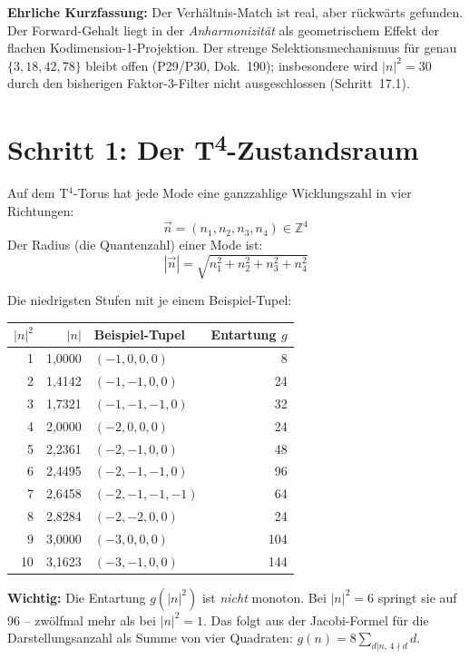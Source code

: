 \textbf{Ehrliche Kurzfassung:} Der Verhältnis-Match ist real, aber
rückwärts gefunden. Der Forward-Gehalt liegt in der \emph{Anharmonizität}
als geometrischem Effekt der flachen Kodimension-1-Projektion. Der
strenge Selektionsmechanismus für genau $\{3,18,42,78\}$ bleibt offen
(P29/P30, Dok.~190); insbesondere wird $|n|^2=30$ durch den bisherigen
Faktor-3-Filter nicht ausgeschlossen (Schritt~17.1).

\section{Schritt 1: Der T\textsuperscript{4}-Zustandsraum}

Auf dem T$^4$-Torus hat jede Mode eine ganzzahlige Wicklungszahl in
vier Richtungen:
\[
  \vec{n} = (n_1, n_2, n_3, n_4) \in \mathbb{Z}^4
\]
Der Radius (die Quantenzahl) einer Mode ist:
\[
  |\vec{n}| = \sqrt{n_1^2 + n_2^2 + n_3^2 + n_4^2}
\]

Die niedrigsten Stufen mit je einem Beispiel-Tupel:

\begin{center}
\begin{tabular}{rrlr}
\toprule
$|n|^2$ & $|n|$ & Beispiel-Tupel & Entartung $g$ \\
\midrule
1 & 1{,}0000 & $(-1,0,0,0)$ & 8 \\
2 & 1{,}4142 & $(-1,-1,0,0)$ & 24 \\
3 & 1{,}7321 & $(-1,-1,-1,0)$ & 32 \\
4 & 2{,}0000 & $(-2,0,0,0)$ & 24 \\
5 & 2{,}2361 & $(-2,-1,0,0)$ & 48 \\
6 & 2{,}4495 & $(-2,-1,-1,0)$ & 96 \\
7 & 2{,}6458 & $(-2,-1,-1,-1)$ & 64 \\
8 & 2{,}8284 & $(-2,-2,0,0)$ & 24 \\
9 & 3{,}0000 & $(-3,0,0,0)$ & 104 \\
10 & 3{,}1623 & $(-3,-1,0,0)$ & 144 \\
\bottomrule
\end{tabular}
\end{center}

\textbf{Wichtig:} Die Entartung $g(|n|^2)$ ist \emph{nicht} monoton.
Bei $|n|^2 = 6$ springt sie auf 96 -- zwölfmal mehr als bei $|n|^2 = 1$.
Das folgt aus der Jacobi-Formel für die Darstellungsanzahl als Summe
von vier Quadraten: $g(n) = 8 \sum_{d | n,\, 4\nmid d} d$.


